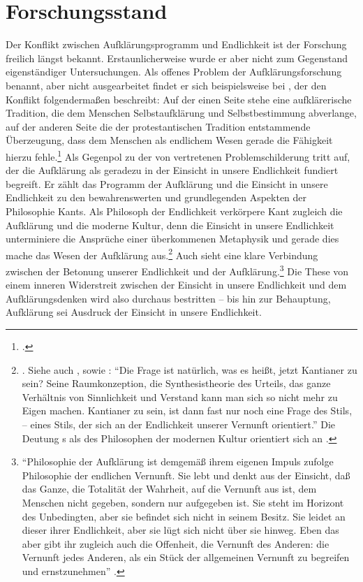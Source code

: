 \section{Forschungsstand}
Der Konflikt zwischen Aufklärungsprogramm und Endlichkeit ist der Forschung
freilich längst bekannt. Erstaunlicherweise wurde er aber nicht zum Gegenstand
eigenständiger Untersuchungen.
Als offenes Problem der Aufklärungsforschung benannt, aber nicht ausgearbeitet
findet er sich beispielsweise bei
, der den Konflikt folgendermaßen
beschreibt: Auf der einen Seite stehe eine aufklärerische Tradition, die dem
Menschen Selbstaufklärung und Selbstbestimmung abverlange, auf der anderen Seite
die der protestantischen Tradition entstammende Überzeugung, dass dem Menschen
als endlichem Wesen gerade die Fähigkeit hierzu
fehle.\footnote{\cite[Vgl.][36]{Engfer:ChristianThomasius1989}.} Als Gegenpol zu
der von  vertretenen
Problemschilderung tritt  auf,
der die Aufklärung als geradezu in der Einsicht in unsere Endlichkeit fundiert
begreift. Er zählt das Programm der Aufklärung und die Einsicht in unsere
Endlichkeit zu den bewahrenswerten und grundlegenden Aspekten der Philosophie
Kants. Als Philosoph der Endlichkeit verkörpere Kant zugleich die Aufklärung und
die moderne Kultur, denn die Einsicht in unsere Endlichkeit unterminiere die
Ansprüche einer überkommenen Metaphysik und gerade dies mache das Wesen der Aufklärung
aus.\footnote{\cite[Vgl.][passim]{Schnaedelbach:WirKantianer2005}. Siehe
auch \cite[][100]{Schnaedelbach:Vernunft2007}, sowie
\cite[][976]{Schnaedelbach:PhilosophiealsGespraech2012}: \enquote{Die Frage ist
natürlich, was es heißt, jetzt Kantianer zu sein? Seine Raumkonzeption, die
Synthesistheorie des Urteils, das ganze Verhältnis von Sinnlichkeit und Verstand
kann man sich so nicht mehr zu Eigen machen. Kantianer zu sein, ist dann fast
nur noch eine Frage des Stils, -- eines Stils, der sich an der Endlichkeit
unserer Vernunft orientiert.} Die Deutung s als des Philosophen
der modernen Kultur orientiert sich an
\textcite[vgl.][]{Rickert:KantalsPhilosophdermodernenKultur1924}.} Auch
 sieht eine
klare Verbindung zwischen der Betonung unserer Endlichkeit und der
Aufklärung.\footnote{\enquote{Philosophie der Aufklärung ist demgemäß ihrem
eigenen Impuls zufolge Philosophie der endlichen Vernunft. Sie lebt und denkt
aus der Einsicht, daß das Ganze, die Totalität der Wahrheit, auf die Vernunft
aus ist, dem Menschen nicht gegeben, sondern nur aufgegeben ist. Sie steht im
Horizont des Unbedingten, aber sie befindet sich nicht in seinem Besitz. Sie
leidet an dieser ihrer Endlichkeit, aber sie lügt sich nicht über sie hinweg.
Eben das aber gibt ihr zugleich auch die Offenheit, die Vernunft des Anderen:
die Vernunft jedes Anderen, als ein Stück der allgemeinen Vernunft zu begreifen
und ernstzunehmen}
\parencite[][38]{Hinske:KantalsHerausforderungandieGegenwart1980}.} Die These von einem
inneren Widerstreit zwischen der Einsicht in unsere Endlichkeit und dem
Aufklärungsdenken wird also durchaus bestritten -- bis hin zur Behauptung,
Aufklärung sei Ausdruck der Einsicht in unsere Endlichkeit.

